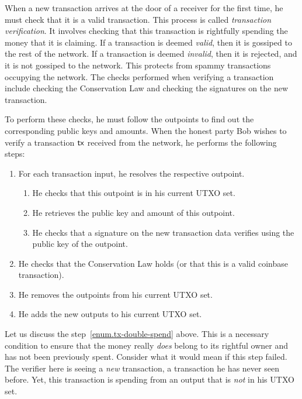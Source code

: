 When a new transaction arrives at the door of a receiver for the first time, he must check that it is
a valid transaction. This process is called \emph{transaction verification}. It involves checking that
this transaction is rightfully spending the money that it is claiming. If a transaction is deemed \emph{valid},
then it is gossiped to the rest of the network. If a transaction is deemed \emph{invalid}, then it is
rejected, and it is not gossiped to the network. This protects from spammy transactions occupying the
network. The checks performed when verifying a transaction include checking the Conservation Law
and checking the signatures on the new transaction.

To perform these checks, he must follow the outpoints to find out the corresponding
public keys and amounts. When the honest party  Bob wishes to verify a transaction $\mathsf{tx}$ received from
the network, he performs the following steps:

\begin{enumerate}
  \item For each transaction input, he resolves the respective outpoint.
  \begin{enumerate}
    \item He checks that this outpoint is in his current UTXO set. \label{enum.tx-double-spend}
    \item He retrieves the public key and amount of this outpoint.
    \item He checks that a signature on the new transaction data verifies using the public key of the outpoint.
  \end{enumerate}
  \item He checks that the Conservation Law holds (or that this is a valid coinbase transaction).
  \item He removes the outpoints from his current UTXO set.
  \item He adds the new outputs to his current UTXO set.
\end{enumerate}

Let us discuss the step~\ref{enum.tx-double-spend} above.
This is a necessary condition to ensure that the money really \emph{does} belong to its rightful owner and
has not been previously spent.
Consider what it would mean if this step failed.
The verifier here is seeing a \emph{new} transaction, a transaction he has never seen before.
Yet, this transaction is spending from an output that is \emph{not} in his UTXO set.

